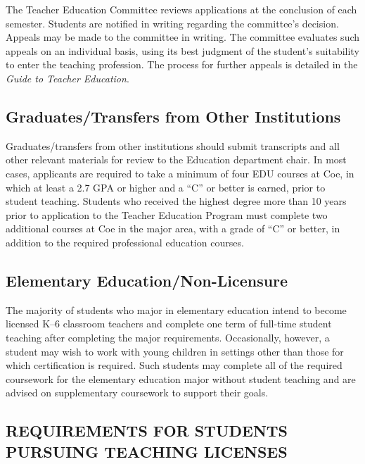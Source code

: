 \documentclass[
  letterpaper,
]{scrbook}
\begin{document}
The Teacher Education Committee reviews applications at the conclusion
of each semester. Students are notified in writing regarding the
committee's decision. Appeals may be made to the committee in writing.
The committee evaluates such appeals on an individual basis, using its
best judgment of the student's suitability to enter the teaching
profession. The process for further appeals is detailed in the
\emph{Guide to Teacher Education}.

\subsection{Graduates/Transfers from Other
Institutions}\label{graduatestransfers-from-other-institutions}

Graduates/transfers from other institutions should submit transcripts
and all other relevant materials for review to the Education department
chair. In most cases, applicants are required to take a minimum of four
EDU courses at Coe, in which at least a 2.7 GPA or higher and a ``C'' or
better is earned, prior to student teaching. Students who received the
highest degree more than 10 years prior to application to the Teacher
Education Program must complete two additional courses at Coe in the
major area, with a grade of ``C'' or better, in addition to the required
professional education courses.

\subsection{Elementary
Education/Non-Licensure}\label{elementary-educationnon-licensure}

The majority of students who major in elementary education intend to
become licensed K--6 classroom teachers and complete one term of
full-time student teaching after completing the major requirements.
Occasionally, however, a student may wish to work with young children in
settings other than those for which certification is required. Such
students may complete all of the required coursework for the elementary
education major without student teaching and are advised on
supplementary coursework to support their goals.

\subsection{REQUIREMENTS FOR STUDENTS PURSUING TEACHING
LICENSES}\label{requirements-for-students-pursuing-teaching-licenses}
\end{document}
